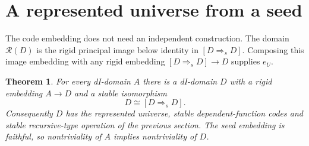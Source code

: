 \documentclass[11pt]{article}
\newtheorem{theorem}{Theorem}[section]
\begin{document}
\section{A represented universe from a seed}

The code embedding does not need an independent construction.
The domain $\mathcal R(D)$ is the rigid principal image below identity
in $[D\Rightarrow_s D]$. Composing this image embedding with any rigid
embedding $[D\Rightarrow_s D]\to D$ supplies $e_U$.

\begin{theorem}
For every dI-domain $A$ there is a dI-domain $D$ with a rigid embedding
$A\to D$ and a stable isomorphism
\[
 D\cong[D\Rightarrow_s D].
\]
Consequently $D$ has the represented universe, stable dependent-function
codes and stable recursive-type operation of the previous section.
The seed embedding is faithful, so nontriviality of $A$ implies
nontriviality of $D$.
\end{theorem}
\end{document}
